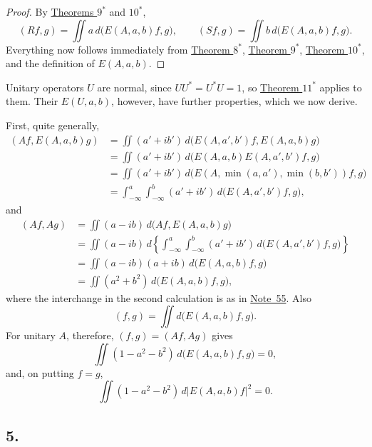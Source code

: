﻿\documentclass[paper=b5,fontsize=13pt,bookmarkpackage=false,twoside]{scrartcl}
\begin{document}
\begin{proof}
By \hyperref[thm:appII-9]{Theorems \(9^*\)} and
\hyperref[thm:appII-10]{\(10^*\)},
\[
  (Rf,g)=\iint a\,d\bigl(E(A,a,b)f,g\bigr),\qquad
  (Sf,g)=\iint b\,d\bigl(E(A,a,b)f,g\bigr).
\]
Everything now follows immediately from
\hyperref[thm:appII-8]{Theorem \(8^*\)},
\hyperref[thm:appII-9]{Theorem \(9^*\)},
\hyperref[thm:appII-10]{Theorem \(10^*\)}, and the definition of
\(E(A,a,b)\).
\end{proof}

Unitary operators \(U\) are normal, since \(UU^*=U^*U=1\), so
\hyperref[thm:appII-11]{Theorem \(11^*\)} applies to them.  Their
\(E(U,a,b)\), however, have further properties, which we now derive.

First, quite generally,
\begin{align*}
 (Af,E(A,a,b)g)
 &=\iint(a'+ib')\,d\bigl(E(A,a',b')f,E(A,a,b)g\bigr)\\
 &=\iint(a'+ib')\,d\bigl(E(A,a,b)E(A,a',b')f,g\bigr)\\
 &=\iint(a'+ib')\,d\bigl(
     E(A,\min(a,a'),\min(b,b'))f,g\bigr)\\
 &=\int_{-\infty}^{a}\int_{-\infty}^{b}
      (a'+ib')\,d\bigl(E(A,a',b')f,g\bigr),
\end{align*}
and
\begin{align*}
 (Af,Ag)
 &=\iint(a-ib)\,d\bigl(Af,E(A,a,b)g\bigr)\\
 &=\iint(a-ib)\,
    d\!\left\{\int_{-\infty}^{a}\int_{-\infty}^{b}
       (a'+ib')\,d\bigl(E(A,a',b')f,g\bigr)\right\}\\
 &=\iint(a-ib)(a+ib)\,d\bigl(E(A,a,b)f,g\bigr)\\
 &=\iint(a^2+b^2)\,d\bigl(E(A,a,b)f,g\bigr),
\end{align*}
where the interchange in the second calculation is as in \hyperref[fn:55]{Note~55}.
Also
\[
  (f,g)=\iint d\bigl(E(A,a,b)f,g\bigr).
\]
For unitary \(A\), therefore, \((f,g)=(Af,Ag)\) gives
\[
  \iint(1-a^2-b^2)\,d\bigl(E(A,a,b)f,g\bigr)=0,
\]
and, on putting \(f=g\),
\[
  \iint(1-a^2-b^2)\,d|E(A,a,b)f|^2=0.
\]

\subsection*{5.}
\label{appII:5}
\end{document}
